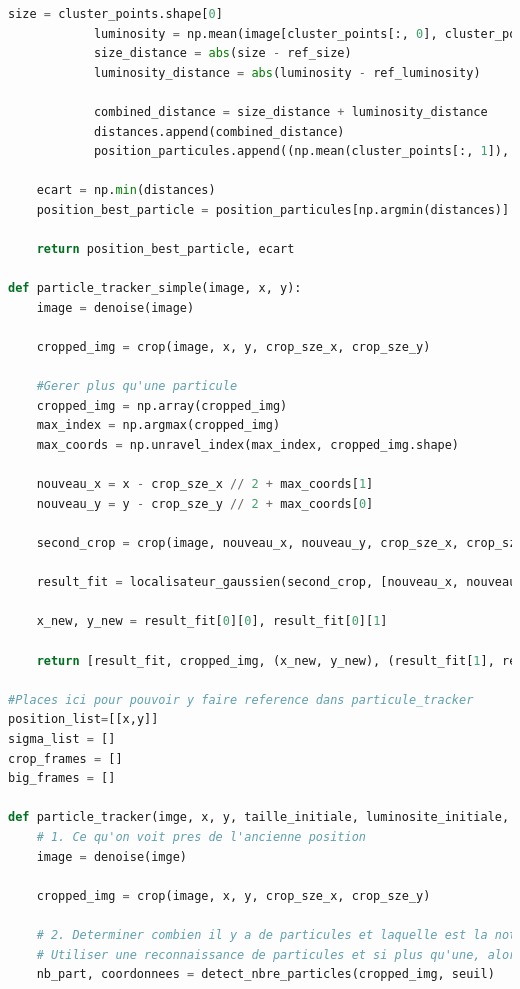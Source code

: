 \documentclass[11pt,letterpaper]{article}
\begin{document}
\begin{lstlisting}[language=python]
            size = cluster_points.shape[0]
            luminosity = np.mean(image[cluster_points[:, 0], cluster_points[:, 1]])
            size_distance = abs(size - ref_size)  
            luminosity_distance = abs(luminosity - ref_luminosity) 
            
            combined_distance = size_distance + luminosity_distance
            distances.append(combined_distance)
            position_particules.append((np.mean(cluster_points[:, 1]), np.mean(cluster_points[:, 0])))

    ecart = np.min(distances)
    position_best_particle = position_particules[np.argmin(distances)]  

    return position_best_particle, ecart

def particle_tracker_simple(image, x, y):
    image = denoise(image)

    cropped_img = crop(image, x, y, crop_sze_x, crop_sze_y)
    
    #Gerer plus qu'une particule
    cropped_img = np.array(cropped_img)
    max_index = np.argmax(cropped_img)
    max_coords = np.unravel_index(max_index, cropped_img.shape)

    nouveau_x = x - crop_sze_x // 2 + max_coords[1]
    nouveau_y = y - crop_sze_y // 2 + max_coords[0]
    
    second_crop = crop(image, nouveau_x, nouveau_y, crop_sze_x, crop_sze_y)    # Re-crop autour d'une seule particule

    result_fit = localisateur_gaussien(second_crop, [nouveau_x, nouveau_y])

    x_new, y_new = result_fit[0][0], result_fit[0][1]

    return [result_fit, cropped_img, (x_new, y_new), (result_fit[1], result_fit[2])]

#Places ici pour pouvoir y faire reference dans particule_tracker
position_list=[[x,y]]
sigma_list = []
crop_frames = []
big_frames = []

def particle_tracker(imge, x, y, taille_initiale, luminosite_initiale, seuil):
    # 1. Ce qu'on voit pres de l'ancienne position
    image = denoise(imge)

    cropped_img = crop(image, x, y, crop_sze_x, crop_sze_y)
    
    # 2. Determiner combien il y a de particules et laquelle est la notre
    # Utiliser une reconnaissance de particules et si plus qu'une, alors clic pour choisir
    nb_part, coordonnees = detect_nbre_particles(cropped_img, seuil)


\end{lstlisting}
\end{document}
